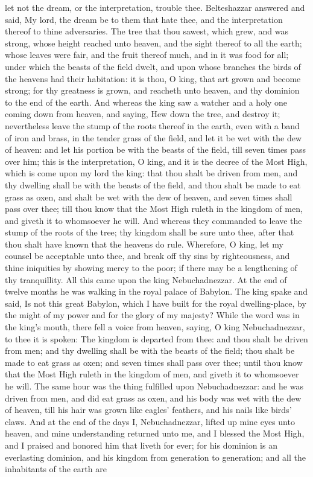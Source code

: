 let not the dream, or the interpretation, trouble thee. Belteshazzar answered and said, My lord, the dream be to them that hate thee, and the interpretation thereof to thine adversaries. The tree that thou sawest, which grew, and was strong, whose height reached unto heaven, and the sight thereof to all the earth; whose leaves were fair, and the fruit thereof much, and in it was food for all; under which the beasts of the field dwelt, and upon whose branches the birds of the heavens had their habitation: it is thou, O king, that art grown and become strong; for thy greatness is grown, and reacheth unto heaven, and thy dominion to the end of the earth. And whereas the king saw a watcher and a holy one coming down from heaven, and saying, Hew down the tree, and destroy it; nevertheless leave the stump of the roots thereof in the earth, even with a band of iron and brass, in the tender grass of the field, and let it be wet with the dew of heaven: and let his portion be with the beasts of the field, till seven times pass over him; this is the interpretation, O king, and it is the decree of the Most High, which is come upon my lord the king: that thou shalt be driven from men, and thy dwelling shall be with the beasts of the field, and thou shalt be made to eat grass as oxen, and shalt be wet with the dew of heaven, and seven times shall pass over thee; till thou know that the Most High ruleth in the kingdom of men, and giveth it to whomsoever he will. And whereas they commanded to leave the stump of the roots of the tree; thy kingdom shall be sure unto thee, after that thou shalt have known that the heavens do rule. Wherefore, O king, let my counsel be acceptable unto thee, and break off thy sins by righteousness, and thine iniquities by showing mercy to the poor; if there may be a lengthening of thy tranquillity.  All this came upon the king Nebuchadnezzar. At the end of twelve months he was walking in the royal palace of Babylon. The king spake and said, Is not this great Babylon, which I have built for the royal dwelling-place, by the might of my power and for the glory of my majesty? While the word was in the king’s mouth, there fell a voice from heaven, saying, O king Nebuchadnezzar, to thee it is spoken: The kingdom is departed from thee: and thou shalt be driven from men; and thy dwelling shall be with the beasts of the field; thou shalt be made to eat grass as oxen; and seven times shall pass over thee; until thou know that the Most High ruleth in the kingdom of men, and giveth it to whomsoever he will. The same hour was the thing fulfilled upon Nebuchadnezzar: and he was driven from men, and did eat grass as oxen, and his body was wet with the dew of heaven, till his hair was grown like eagles’ feathers, and his nails like birds’ claws.  And at the end of the days I, Nebuchadnezzar, lifted up mine eyes unto heaven, and mine understanding returned unto me, and I blessed the Most High, and I praised and honored him that liveth for ever; for his dominion is an everlasting dominion, and his kingdom from generation to generation; and all the inhabitants of the earth are 